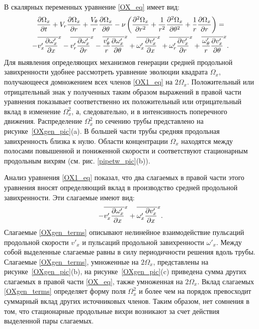 В скалярных переменных уравнение \eqref{OX_eq} имеет вид:
\begin{multline}\label{OX1_eq}
\frac{\partial \Omega_x}{\partial t} + V_r \frac{\partial \Omega_x}{\partial r} + \frac{V_\theta}{r} \frac{\partial \Omega_x}{\partial \theta}
 - \nu\left(\frac{\partial ^2\Omega_x}{\partial r^2} + \frac{1}{r^2}\frac{\partial ^2\Omega_x}{\partial \theta^2} + \frac{1}{r}\frac{\partial \Omega_x}{\partial r}\right)= \\
 - \overline{v'_x \frac{\partial \omega'_x}{\partial x}}^x - \overline{v'_r \frac{\partial \omega'_x}{\partial r}}^x - \overline{\frac{v'_\theta}{r} \frac{\partial \omega'_x}{\partial \theta}}^x
 + \overline{\omega'_x \frac{\partial v'_x}{\partial x}}^x + \overline{\omega'_r \frac{\partial v'_x}{\partial r}}^x + \overline{\frac{\omega'_\theta}{r} \frac{\partial v'_x}{\partial \theta}}^x.
\end{multline}
Для выявления определяющих механизмов генерации средней продольной завихренности удобнее рассмотреть уравнение эволюции квадрата $\Omega_x$, получающееся домножением всех членов \eqref{OX1_eq} на $2\Omega_x$. Положительный или отрицательный знак у полученных таким образом выражений в правой части уравнения показывает соответственно их положительный или отрицательный вклад в изменение $\Omega_x^2$, а, следовательно, и в интенсивность поперечного движения. Распределение $\Omega_x^2$ по сечению трубы представлено на рисунке~\ref{OXgen_pic}(a). В большей части трубы средняя продольная завихренность близка к нулю. Области концентрации $\Omega_x$ находятся между полосами повышенной и пониженной скорости и соответствуют стационарным продольным вихрям (см. рис. \ref{pipetw_pic}(b)). 

Анализ уравнения \eqref{OX1_eq} показал, что два слагаемых в правой части этого уравнения вносят определяющий вклад в производство средней продольной завихренности. Эти слагаемые имеют вид:
\begin{equation}\label{OXgen_terms}
- \overline{v'_x \frac{\partial \omega'_x}{\partial x}}^x + \overline{ \omega'_x \frac{\partial v'_x}{\partial x} }^x.
\end{equation}
Слагаемые \eqref{OXgen_terms} описывают нелинейное взаимодействие пульсаций продольной скорости $v'_x$ и пульсаций продольной завихренности $\omega'_x$. Между собой выделенные слагаемые равны в силу периодичности решения вдоль трубы. Слагаемые \eqref{OXgen_terms}, умноженные на $2\Omega_x$, представлены на рисунке~\ref{OXgen_pic}(b), на рисунке~\ref{OXgen_pic}(c) приведена сумма других слагаемых в правой части \eqref{OX_eq}, также умноженная на $2\Omega_x$. Вклад слагаемых \eqref{OXgen_terms} определяет форму поля $\Omega_x^2$ и более чем на порядок превосходит суммарный вклад других источниковых членов. Таким образом, нет сомнения в том, что стационарные продольные вихри возникают за счет действия выделенной пары слагаемых.


